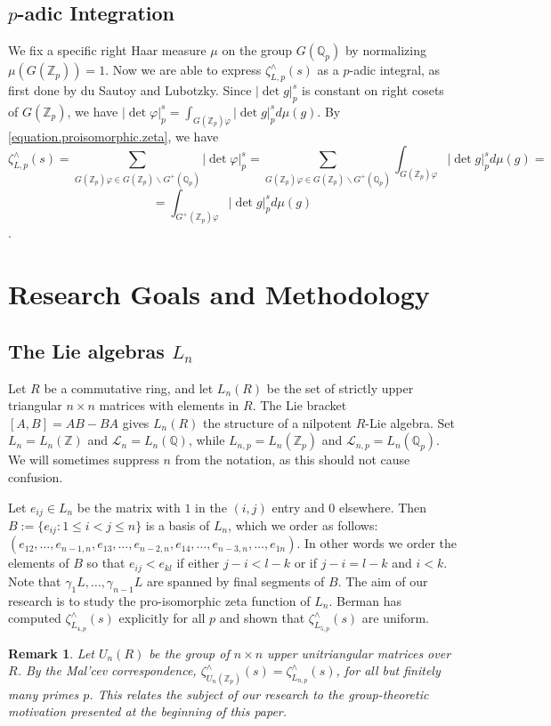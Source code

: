 \documentclass[12pt]{article}
\newtheorem{remark}[theorem]{Remark}
\begin{document}
\subsection{$p$-adic Integration}
We fix a specific right Haar measure $\mu$ on the group $G(\mathbb{Q}_{p})$ by normalizing $\mu(G(\mathbb{Z}_p))=1$. Now we are able to express $\zeta_{L,p}^{\wedge}(s)$ as a $p$-adic integral, as first done by du Sautoy and Lubotzky\cite{DuSautoyLubotzky}. Since $|\det{g}|_{p}^{s}$ is constant on right cosets of $G(\mathbb{Z}_{p})$, we have $|\det\varphi|_{p}^{s}=\displaystyle\int_{G(\mathbb{Z}_p)\varphi}{|\det{g}|_{p}^{s}}d\mu(g)$. By \eqref{equation.proisomorphic.zeta}, we have \[\zeta_{L,p}^{\wedge}(s)=\underset{\scriptscriptstyle G(\mathbb{Z}_p)\varphi\in G(\mathbb{Z}_p)\backslash{G^{+}(\mathbb{Q}_p)}}{\sum}|\det\varphi|_{p}^{s}=\underset{\scriptscriptstyle{G(\mathbb{Z}_p)}\varphi\in G(\mathbb{Z}_p)\backslash{G^{+}(\mathbb{Q}_p)}}{\sum}\displaystyle{\int_{G(\mathbb{Z}_p)\varphi}}{|\det{g}|_{p}^{s}}d\mu(g)=\]\[=\displaystyle\int_{G^{+}(\mathbb{Z}_p)\varphi}{|\det{g}|_{p}^{s}}d\mu(g)\].
\section{Research Goals and Methodology}
\subsection{The Lie algebras $L_{n}$}
Let $R$ be a commutative ring, and let $L_{n}(R)$ be the set of strictly upper triangular $n\times{n}$ matrices with elements in $R$. The Lie bracket $[A,B]=AB-BA$ gives $L_{n}(R)$ the structure of a nilpotent $R$-Lie algebra. Set $L_{n}=L_{n}(\mathbb{Z})$ and $\mathcal{L}_{n}=L_{n}(\mathbb{Q})$, while $L_{n,p}=L_{n}(\mathbb{Z}_{p})$ and $\mathcal{L}_{n,p}=L_{n}(\mathbb{Q}_{p})$. We will sometimes suppress $n$ from the notation, as this should not cause confusion.\par
Let $e_{ij}\in{L_{n}}$ be the matrix with $1$ in the $(i,j)$ entry and $0$ elsewhere. Then $B:=\{e_{ij} : 1\leq{i}<{j}\leq{n}\}$ is a basis of $L_{n}$, which we order as follows: $(e_{12},\dots,e_{n-1,n},e_{13},\dots,e_{n-2,n},e_{14},\dots,e_{n-3,n},\dots,e_{1n})$. In other words we order the elements of $B$ so that $e_{ij}<e_{kl}$ if either $j-i<l-k$ or if $j-i=l-k$ and $i<k$. Note that $\gamma_{1}L,\dots,\gamma_{n-1}L$ are spanned by final segments of $B$. The aim of our research is to study the pro-isomorphic zeta function of $L_{n}$. Berman has computed $\zeta_{L_{4,p}}^{\wedge}(s)$ explicitly for all $p$ and shown that $\zeta_{L_{5,p}}^{\wedge}(s)$ are uniform.
\begin{remark}
Let $U_n(R)$ be the group of $n\times{n}$ upper unitriangular matrices over $R$. By the Mal'cev correspondence, ${\zeta^\wedge_{U_{n}(\mathbb{Z}_{p})}}(s)={\zeta^\wedge_{L_{n,p}}}(s)$, for all but finitely many primes $p$. This relates the subject of our research to the group-theoretic motivation presented at the beginning of this paper.
\end{remark}
\end{document}
